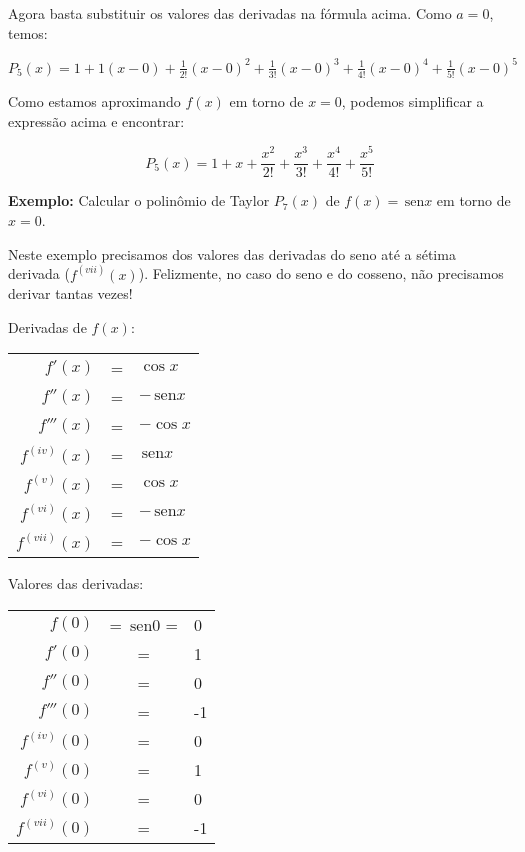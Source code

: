 \documentclass[a4paper]{article}
\providecommand{\sin}{} \renewcommand{\sin}{\hspace{2pt}\mathrm{sen}}
\begin{document}
Agora basta substituir os valores das derivadas na fórmula acima.
Como $a=0$, temos:

$P_5(x) = 1+ 1(x-0) + \frac{1}{2!}(x-0)^2 + \frac{1}{3!}(x-0)^3 + \frac{1}{4!}(x-0)^4 + \frac{1}{5!}(x-0)^5$

Como estamos aproximando $f(x)$ em torno de $x=0$, podemos simplificar a expressão acima e encontrar:

\begin{displaymath}
  P_5(x) = 1+ x + \frac{x^2}{2!} + \frac{x^3}{3!} + \frac{x^4}{4!} + \frac{x^5}{5!}
\end{displaymath}

{\bf Exemplo:} Calcular o polinômio de Taylor $P_7(x)$ de $f(x)=\sin x$ em torno de $x=0$.

Neste exemplo precisamos dos valores das derivadas do seno até a sétima derivada ($f^{(vii)}(x)$).
Felizmente, no caso do seno e do cosseno, não precisamos derivar tantas vezes!

\begin{multicols}{2}

Derivadas de $f(x)$:

  \begin{tabular}{rcl}
    $f'(x)$ &=& $\cos x$\\
    $f''(x)$ &=& $-\sin x$\\
    $f'''(x)$ &=& $-\cos x$\\
    $f^{(iv)}(x)$ &=& $\sin x$\\
    $f^{(v)}(x)$ &=& $\cos x$\\
    $f^{(vi)}(x)$ &=& $-\sin x$\\
    $f^{(vii)}(x)$ &=& $-\cos x$\\
  \end{tabular}

  \columnbreak

Valores das derivadas:

  \begin{tabular}{rcl}
    $f(0)$ &= $\sin 0$ =& 0\\
    $f'(0)$ &=& 1\\
    $f''(0)$ &=& 0\\
    $f'''(0)$ &=& -1\\
    $f^{(iv)}(0)$ &=& 0\\
    $f^{(v)}(0)$ &=& 1\\
    $f^{(vi)}(0)$ &=& 0\\
    $f^{(vii)}(0)$ &=& -1\\
  \end{tabular}
\end{multicols}
\end{document}
